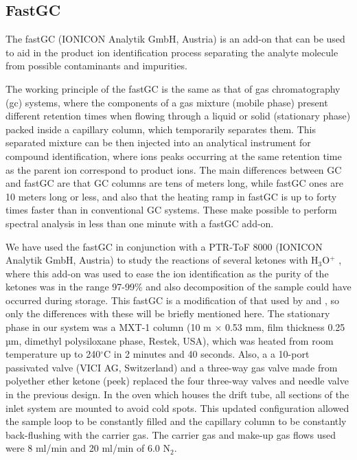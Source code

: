 \subsection{FastGC}\label{section:fastgc}
The fastGC (IONICON Analytik GmbH, Austria) is an add-on that can be used to aid in the product ion identification process separating the analyte molecule from possible contaminants and impurities.

The working principle of the fastGC is the same as that of gas chromatography (\acrshort{gc}) systems, where
%
the components of a  gas mixture (mobile phase) present different retention times when flowing through a liquid or solid (stationary phase) packed inside a capillary column, which temporarily separates them.
%
This separated mixture can be then injected into an analytical instrument for compound identification, where ions peaks occurring at the same retention time as the parent ion correspond to product ions.
%
The main differences between GC and fastGC are that GC columns are tens of meters long, while fastGC ones are  10 meters long or less, and
%
also that the heating ramp in fastGC  is up to forty times faster than in conventional GC systems.
%
These make possible to perform spectral analysis in less than one minute with  a fastGC add-on.



We have used the fastGC in conjunction with a PTR-ToF 8000 (IONICON Analytik GmbH, Austria) to study the reactions of several ketones with H$_3$O$^+$ \cite{malaskova2019compendium}, where this add-on was used to ease the ion identification as the purity of the ketones was in the range 97-99\% and also decomposition of the sample could have occurred during storage.
%
This fastGC  is a modification of that used by \citeauthor{ruzsanyi2013multi} and \citeauthor{romano2014wine} \cite{ruzsanyi2013multi,romano2014wine}, so only the differences with these will be briefly mentioned here.
%
%
The stationary phase in our system was a MXT-1 column (10 m × 0.53 mm, film thickness 0.25 µm, dimethyl polysiloxane phase, Restek, USA), which was heated from room temperature up to 240$^{\circ}$C in  2 minutes and 40 seconds.
%
Also, a a 10-port passivated valve (VICI AG, Switzerland) and a three-way gas valve made from polyether ether ketone (\acrshort{peek}) replaced the four three-way valves and  needle valve in the previous design.
%
In the oven which houses the drift tube, all sections of the inlet system are mounted to avoid cold spots.
%
This updated configuration allowed the sample loop to be constantly filled and the capillary column to be constantly back-flushing with the carrier gas.
%
The  carrier gas and make-up gas flows used were  8 ml/min and 20 ml/min of 6.0 N$_2$.







